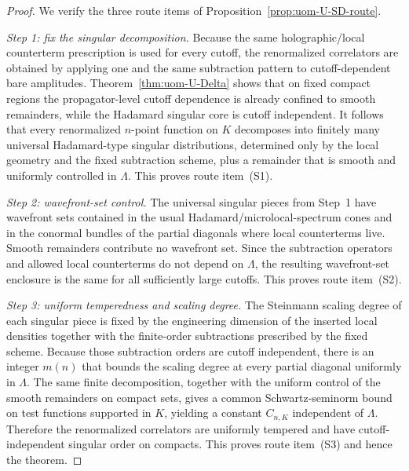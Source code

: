 \documentclass[10pt]{article}
\theoremstyle{definition}
\theoremstyle{plain}
\begin{document}
\begin{proof}
We verify the three route items of Proposition~\ref{prop:uom-U-SD-route}.

\emph{Step 1: fix the singular decomposition.}
Because the same holographic/local counterterm prescription is used for every cutoff, the renormalized correlators are obtained by applying one and the
same subtraction pattern to cutoff-dependent bare amplitudes.  Theorem~\ref{thm:uom-U-Delta} shows that on fixed compact regions the propagator-level
cutoff dependence is already confined to smooth remainders, while the Hadamard singular core is cutoff independent.  It follows that every renormalized
$n$-point function on $K$ decomposes into finitely many universal Hadamard-type singular distributions, determined only by the local geometry and the fixed
subtraction scheme, plus a remainder that is smooth and uniformly controlled in $\Lambda$.  This proves route item~\textnormal{(S1)}.

\emph{Step 2: wavefront-set control.}
The universal singular pieces from Step~1 have wavefront sets contained in the usual Hadamard/microlocal-spectrum cones and in the conormal bundles of the
partial diagonals where local counterterms live.  Smooth remainders contribute no wavefront set.  Since the subtraction operators and allowed local
counterterms do not depend on $\Lambda$, the resulting wavefront-set enclosure is the same for all sufficiently large cutoffs.  This proves route item~\textnormal{(S2)}.

\emph{Step 3: uniform temperedness and scaling degree.}
The Steinmann scaling degree of each singular piece is fixed by the engineering dimension of the inserted local densities together with the finite-order
subtractions prescribed by the fixed scheme.  Because those subtraction orders are cutoff independent, there is an integer $m(n)$ that bounds the scaling
degree at every partial diagonal uniformly in $\Lambda$.  The same finite decomposition, together with the uniform control of the smooth remainders on
compact sets, gives a common Schwartz-seminorm bound on test functions supported in $K$, yielding a constant $C_{n,K}$ independent of $\Lambda$.
Therefore the renormalized correlators are uniformly tempered and have cutoff-independent singular order on compacts.  This proves route item~\textnormal{(S3)} and hence the theorem.
\end{proof}

\end{document}
